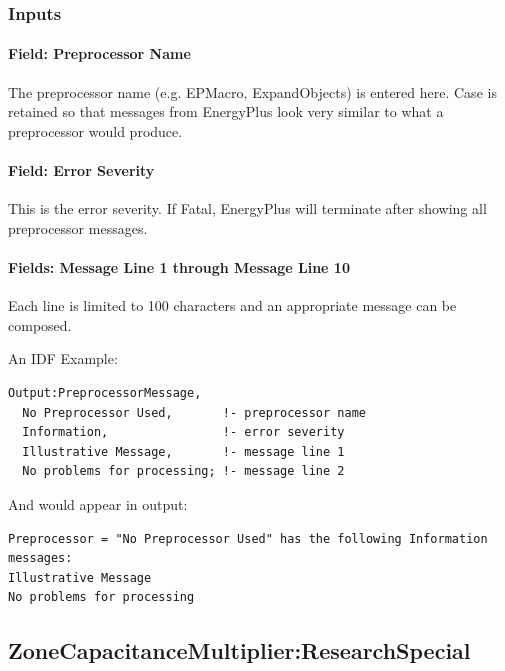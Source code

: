 \subsubsection{Inputs}\label{inputs-13-014}

\paragraph{Field: Preprocessor Name}\label{field-preprocessor-name}

The preprocessor name (e.g. EPMacro, ExpandObjects) is entered here. Case is retained so that messages from EnergyPlus look very similar to what a preprocessor would produce.

\paragraph{Field: Error Severity}\label{field-error-severity}

This is the error severity. If Fatal, EnergyPlus will terminate after showing all preprocessor messages.

\paragraph{Fields: Message Line 1 through Message Line 10}\label{fields-message-line-1-through-message-line-10}

Each line is limited to 100 characters and an appropriate message can be composed.

An IDF Example:

\begin{lstlisting}
Output:PreprocessorMessage,
  No Preprocessor Used,       !- preprocessor name
  Information,                !- error severity
  Illustrative Message,       !- message line 1
  No problems for processing; !- message line 2
\end{lstlisting}

And would appear in output:

\begin{lstlisting}
Preprocessor = "No Preprocessor Used" has the following Information messages:
Illustrative Message
No problems for processing
\end{lstlisting}

\subsection{ZoneCapacitanceMultiplier:ResearchSpecial}\label{zonecapacitancemultiplierresearchspecial}

